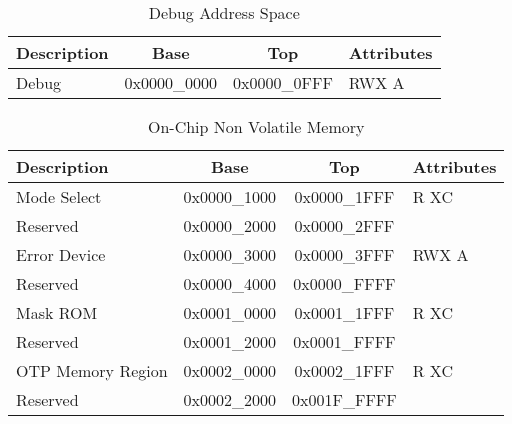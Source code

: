 \documentclass[a4paper,12pt,twoside]{report}
\begin{document}
            	\begin{table}[H]
            		\centering
            		\begin{tabular}{| p{3cm} | c | c | p{3cm} |}
            			\hline
            			\textbf{Description} & \textbf{Base} & \textbf{Top} & \textbf{Attributes}\\
            			\hline
            			\hline
            			Debug & 0x0000\_0000 & 0x0000\_0FFF & RWX A\\
            			\hline
            		\end{tabular}
            		\caption{Debug Address Space}
            	\end{table}

            	\begin{table}[H]
            		\centering
            		\begin{tabular}{| p{4cm} | c | c | p{3cm} |}
            			\hline
            			\textbf{Description} & \textbf{Base} & \textbf{Top} & \textbf{Attributes}\\
            			\hline
            			Mode Select & 0x0000\_1000 & 0x0000\_1FFF & R XC\\
            			Reserved & 0x0000\_2000 & 0x0000\_2FFF & \\
            			Error Device & 0x0000\_3000 & 0x0000\_3FFF & RWX A\\
            			Reserved & 0x0000\_4000 & 0x0000\_FFFF & \\
            			Mask ROM & 0x0001\_0000 & 0x0001\_1FFF & R XC\\
            			Reserved & 0x0001\_2000 & 0x0001\_FFFF & \\
            			OTP Memory Region & 0x0002\_0000 & 0x0002\_1FFF & R XC\\
            			Reserved & 0x0002\_2000 & 0x001F\_FFFF & \\
            			\hline
            		\end{tabular}
            		\caption{On-Chip Non Volatile Memory}
            	\end{table}
\end{document}
